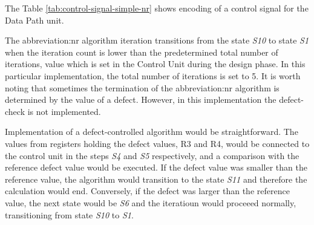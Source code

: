 \documentclass[a4paper, twoside, 11pt]{article}
\newcommand{\fbar}{\FloatBarrier}
\begin{document}
            The Table \ref{tab:control-signal-simple-nr} shows encoding of a control signal for the Data Path unit.\par
            The \gls{abbreviation:nr} algorithm iteration transitions from the state \textit{S10} to state \textit{S1} when the iteration count is lower than the predetermined total number of iterations, value which is set in the Control Unit during the design phase. In this particular implementation, the total number of iterations is set to 5. It is worth noting that sometimes the termination of the \gls{abbreviation:nr} algorithm is determined by the value of a defect. However, in this implementation the defect-check is not implemented.\par
            Implementation of a defect-controlled algorithm would be straightforward. The values from registers holding the defect values, R3 and R4, would be connected to the control unit in the steps \textit{S4} and \textit{S5} respectively, and a comparison with the reference defect value would be executed. If the defect value was smaller than the reference value, the algorithm would transition to the state \textit{S11} and therefore the calculation would end. Conversely, if the defect was larger than the reference value, the next state would be \textit{S6} and the iteratioun would proceeed normally, transitioning from state \textit{S10} to \textit{S1}.

            

    \fbar
\end{document}
